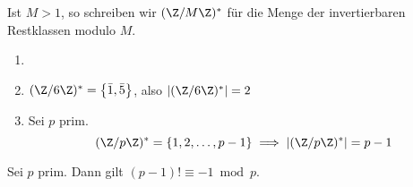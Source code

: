 \begin{notat*}
	Ist $M > 1$, so schreiben wir \( (\Z / M\Z)^* \) für die Menge der invertierbaren Restklassen modulo $M$.
\end{notat*}

\begin{exmp*}
	\begin{enumerate}
		\item[]
		\item \( (\Z/6\Z)^* = \left\{\bar{1},\bar{5}\right\} \), also \( |(\Z/6\Z)^*| = 2 \)
		\item Sei $p$ prim.
		\[ (\Z/p\Z)^* = \{1, 2, \dotsc, p-1 \} \implies |(\Z/p\Z)^*| = p-1 \]
	\end{enumerate}
\end{exmp*}

\begin{lem}\autolabel
	Sei $p$ prim. Dann gilt \( (p-1)! \equiv -1 \bmod p. \)
\end{lem}
